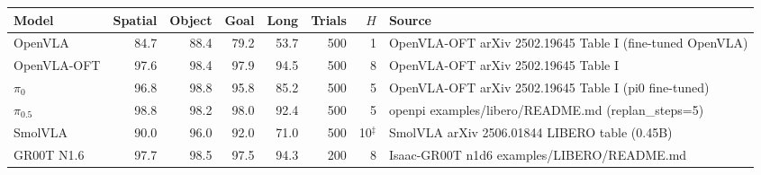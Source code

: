 {\small\setlength{\tabcolsep}{4pt}\begin{tabular}{lrrrrrrp{5.6cm}}
\toprule
Model & Spatial & Object & Goal & Long & Trials & $H$ & Source \\
\midrule
OpenVLA & 84.7 & 88.4 & 79.2 & 53.7 & 500 & 1 & OpenVLA-OFT arXiv 2502.19645 Table I (fine-tuned OpenVLA) \\
OpenVLA-OFT & 97.6 & 98.4 & 97.9 & 94.5 & 500 & 8 & OpenVLA-OFT arXiv 2502.19645 Table I \\
$\pi_0$ & 96.8 & 98.8 & 95.8 & 85.2 & 500 & 5 & OpenVLA-OFT arXiv 2502.19645 Table I (pi0 fine-tuned) \\
$\pi_{0.5}$ & 98.8 & 98.2 & 98.0 & 92.4 & 500 & 5 & openpi examples/libero/README.md (replan\_steps=5) \\
SmolVLA & 90.0 & 96.0 & 92.0 & 71.0 & 500 & 10$^\ddagger$ & SmolVLA arXiv 2506.01844 LIBERO table (0.45B) \\
GR00T N1.6 & 97.7 & 98.5 & 97.5 & 94.3 & 200 & 8 & Isaac-GR00T n1d6 examples/LIBERO/README.md \\
\bottomrule
\end{tabular}}
